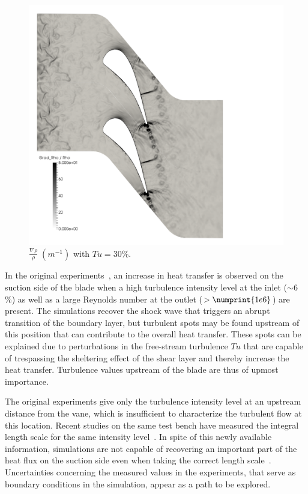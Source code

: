 
\begin{figure}[!h]
\centering
\includegraphics[width=0.6\linewidth,keepaspectratio]{fig/applications/ls89/10_2column_color-online-only_gradRhoRho.pdf}
\caption{$\frac{\nabla \rho}{\rho}\; (m^{-1})$ with $Tu = 30\%$.}
\label{fig:ls89-gradRhoRho}
\end{figure}


In the original experiments~\cite{arts1990}, an increase in heat transfer is observed on the suction side of the blade when a high turbulence intensity level at the inlet ($\sim 6$\%) as well as a large Reynolds number at the outlet ($>\numprint{1e6}$) are present. The simulations recover the shock wave that triggers an abrupt transition of the boundary layer, but turbulent spots may be found upstream of this position that can contribute to the overall heat transfer. These spots can be explained due to perturbations in the free-stream turbulence $Tu$ that are capable of trespassing the sheltering effect of the shear layer and thereby increase the heat transfer. Turbulence values upstream of the blade are thus of upmost importance.

The original experiments give only the turbulence intensity level at an upstream distance from the vane, which is insufficient to characterize the turbulent flow at this location. Recent studies on the same test bench have measured the integral length scale for the same intensity level~\cite{Fontaneto2014}. In spite of this newly available information, simulations are not capable of recovering an important part of the heat flux on the suction side even when taking the correct length scale~\cite{Pichler2016}. Uncertainties concerning the measured values in the experiments, that serve as boundary conditions in the simulation, appear as a path to be explored. 


